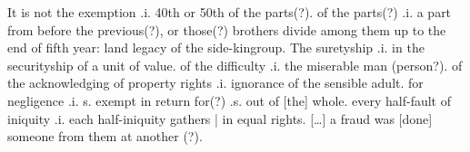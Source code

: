 \documentclass[11pt]{article}
\begin{document}
\begin{pages}
\begin{Rightside}
  It is not the exemption .i. 40th or 50th of the parts(?). of the parts(?) .i. a part from before the previous(?), or those(?) brothers divide among them up to the end of fifth year: land legacy of the side-kingroup. The suretyship .i. in the securityship of a unit of value.  of the difficulty .i. the miserable man (person?). of the acknowledging of property rights .i. ignorance of the sensible adult. for negligence .i. s. exempt in return for(?) .s. out of [the] whole. every half-fault of iniquity .i. each half-iniquity gathers | in equal rights. [\ldots{}]  a fraud was [done] someone from them at another (?). 

    \pend
  \endnumbering
  \end{Rightside}

  \Pages
\end{pages}
\end{document}
